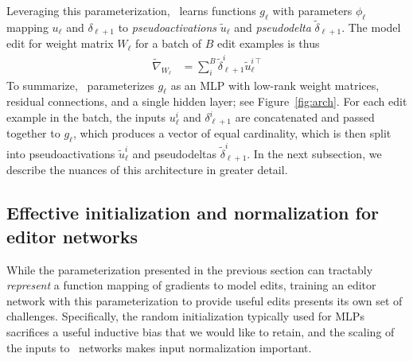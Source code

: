 \documentclass{article}
\begin{document}
Leveraging this parameterization, \name~learns functions $g_\ell$ with parameters $\phi_\ell$ mapping $u_\ell$ and $\delta_{\ell+1}$ to \textit{pseudoactivations} $\tilde u_\ell$ and \textit{pseudodelta} $\tilde\delta_{\ell+1}$. The model edit for weight matrix $W_\ell$ for a batch of $B$ edit examples is thus
\begin{align}
    \tilde{\nabla}_{W_\ell} &= \sum_i^B\tilde\delta_{\ell + 1}^{i}{\tilde u_\ell^{i\,\top}}
\end{align}
To summarize, \name~parameterizes $g_\ell$ as an MLP with low-rank weight matrices, residual connections, and a single hidden layer; see Figure~\ref{fig:arch}. For each edit example in the batch, the inputs $u_\ell^i$ and $\delta_{\ell+1}^i$ are concatenated and passed together to $g_\ell$, which produces a vector of equal cardinality, which is then split into pseudoactivations $\tilde u_\ell^i$ and pseudodeltas $\tilde \delta_{\ell+1}^i$. In the next subsection, we describe the nuances of this architecture in greater detail. 

\subsection{Effective initialization and normalization for editor networks}
While the parameterization presented in the previous section can tractably \textit{represent} a function mapping of gradients to model edits, training an editor network with this parameterization to provide useful edits presents its own set of challenges. Specifically, the random initialization typically used for MLPs sacrifices a useful inductive bias that we would like to retain, and the scaling of the inputs to \name~networks makes input normalization important.
\end{document}
